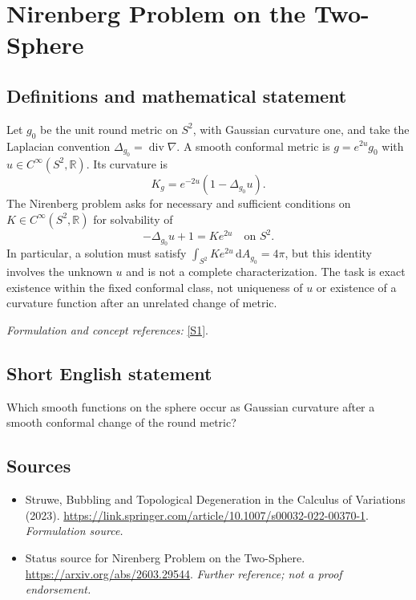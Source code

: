 \documentclass[11pt]{article}
\begin{document}
\section*{\texorpdfstring{Nirenberg Problem on the Two-Sphere}{Nirenberg Problem on the Two-Sphere}}\label{statement}
\subsection{Definitions and mathematical statement}
Let $g_0$ be the unit round metric on $S^2$, with Gaussian curvature one, and take the Laplacian convention $\Delta_{g_0}=\operatorname{div}\nabla$. A smooth conformal metric is $g=e^{2u}g_0$ with $u\in C^\infty(S^2,{\mathbb{R}})$. Its curvature is
\[
 K_g=e^{-2u}(1-\Delta_{g_0}u).
\]
The Nirenberg problem asks for necessary and sufficient conditions on $K\in C^\infty(S^2,{\mathbb{R}})$ for solvability of
\[
 -\Delta_{g_0}u+1=K e^{2u}\quad\text{on }S^2.
\]
In particular, a solution must satisfy $\int_{S^2}K e^{2u}{\,\mathrm{d}} A_{g_0}=4\pi$, but this identity involves the unknown $u$ and is not a complete characterization. The task is exact existence within the fixed conformal class, not uniqueness of $u$ or existence of a curvature function after an unrelated change of metric.
\par\smallskip\textit{Formulation and concept references:} \href{https://link.springer.com/article/10.1007/s00032-022-00370-1}{[S1]}.

\subsection{Short English statement}
Which smooth functions on the sphere occur as Gaussian curvature after a smooth conformal change of the round metric?
\subsection{Sources}
\begin{itemize}
\item[S1]Struwe, Bubbling and Topological Degeneration in the Calculus of Variations (2023).
\url{https://link.springer.com/article/10.1007/s00032-022-00370-1}.
\textit{Formulation source.}
\item[S2]Status source for Nirenberg Problem on the Two-Sphere.
\url{https://arxiv.org/abs/2603.29544}.
\textit{Further reference; not a proof endorsement.}
\end{itemize}
\end{document}
